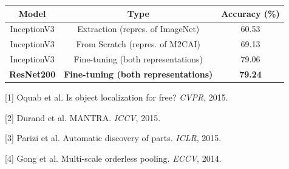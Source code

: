 \documentclass[landscape,a0paper,fontscale=0.292]{baposter}
\begin{document}
\begin{poster}
{\begin{minipage}[t]{8cm}
	\begin{center}
		\begin{tabular}{|c|c|c|}
			\hline
			Model & Type & Accuracy (\%) \\
			\hline\hline
			InceptionV3 & Extraction (repres. of ImageNet)& 60.53 \\
			InceptionV3 & From Scratch (repres. of M2CAI) & 69.13 \\
			InceptionV3 & Fine-tuning (both representations) & 79.06 \\
			\textbf{ResNet200} & \textbf{Fine-tuning (both representations)} & \textbf{79.24} \\
			\hline
		\end{tabular}
	\end{center}

\end{minipage} \hfill 
\begin{minipage}[t]{8cm}

\begin{center}
	\end{center}


{
\scriptsize
[1] Oquab et al. Is object localization for free? {\em CVPR}, 2015.

[2] Durand et al. MANTRA. {\em ICCV}, 2015.

[3] Parizi et al. Automatic discovery of parts. {\em ICLR}, 2015.

[4] Gong et al. Multi-scale orderless pooling. {\em ECCV}, 2014.

}

\end{minipage}


}



\end{poster}
\end{document}
